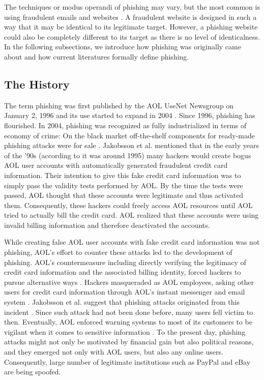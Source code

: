 The techniques or modus operandi of phishing may vary, but the most
common is using fraudulent emails and websites \citep{james:2005}.
A fraudulent website is designed in such a way that it may be identical
to its legitimate target. However, a phishing website could also be
completely different to its target as there is no level of identicalness.
In the following subsections, we introduce how phishing was originally
came about and how current literatures formally define phishing.


\subsection{The History }

The term \textquotedbl{}phishing\textquotedbl{} was first published
by the \ac{AOL} UseNet Newsgroup on January 2, 1996 and its use started
to expand in 2004 \citep{phishorg}. Since 1996, phishing has flourished.
In 2004, phishing was recognized as fully industrialized in terms
of economy of crime: On the black market off-the-shelf components
for ready-made phishing attacks were for sale \citep{abad2005economy}.
Jakobsson et al. \citep{jakobsson:2006} mentioned that in the early
years of the '90s (according to \citep{phishorg} it was around 1995)
many hackers would create bogus AOL user accounts with automatically
generated fraudulent credit card information. Their intention to give
this fake credit card information was to simply pass the validity
tests performed by AOL. By the time the tests were passed, AOL thought
that these accounts were legitimate and thus activated them. Consequently,
these hackers could freely access AOL resources until AOL tried to
actually bill the credit card. AOL realized that these accounts were
using invalid billing information and therefore deactivated the accounts.

While creating false AOL user accounts with fake credit card information
was not phishing, AOL's effort to counter these attacks led to the
development of phishing. AOL's countermeasure including directly verifying
the legitimacy of credit card information and the associated billing
identity, forced hackers to pursue alternative ways \citep{jakobsson:2006}.
Hackers masqueraded as AOL employees, asking other users for credit
card information through AOL's instant messenger and email system
\citep{phishorg}. Jakobsson et al. suggest that phishing attacks
originated from this incident \citep{jakobsson:2006}. Since such
attack had not been done before, many users fell victim to then. Eventually,
AOL enforced warning systems to most of its customers to be vigilant
when it comes to sensitive information \citep{phishorg}. To the present
day, phishing attacks might not only be motivated by financial gain
but also political reasons, and they emerged not only with AOL users,
but also any online users. Consequently, large number of legitimate
institutions such as PayPal and eBay are being spoofed.


